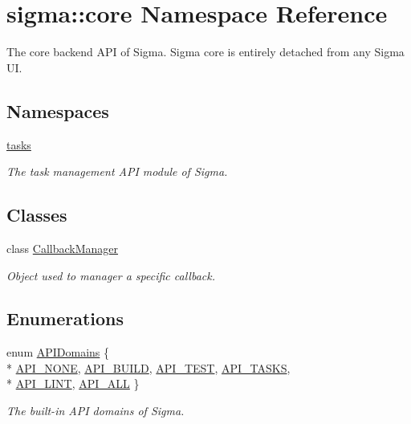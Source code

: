 \hypertarget{namespacesigma_1_1core}{}\section{sigma\+:\+:core Namespace Reference}
\label{namespacesigma_1_1core}


The core backend A\+P\+I of Sigma. Sigma core is entirely detached from any Sigma U\+I.  


\subsection*{Namespaces}
\begin{DoxyCompactItemize}
\item 
 \hyperlink{namespacesigma_1_1core_1_1tasks}{tasks}
\begin{DoxyCompactList}\small\item\em The task management A\+P\+I module of Sigma. \end{DoxyCompactList}\end{DoxyCompactItemize}
\subsection*{Classes}
\begin{DoxyCompactItemize}
\item 
class \hyperlink{classsigma_1_1core_1_1_callback_manager}{Callback\+Manager}
\begin{DoxyCompactList}\small\item\em Object used to manager a specific callback. \end{DoxyCompactList}\end{DoxyCompactItemize}
\subsection*{Enumerations}
\begin{DoxyCompactItemize}
\item 
enum \hyperlink{namespacesigma_1_1core_a48ec553a4adec5e4ca04a94946e39227}{A\+P\+I\+Domains} \{ \\*
\hyperlink{namespacesigma_1_1core_a48ec553a4adec5e4ca04a94946e39227ad5c128a2a2f3f1354dc44fd6e477b2c9}{A\+P\+I\+\_\+\+N\+O\+N\+E}, 
\hyperlink{namespacesigma_1_1core_a48ec553a4adec5e4ca04a94946e39227a21b294c75f929374e9eebfa67e31d80b}{A\+P\+I\+\_\+\+B\+U\+I\+L\+D}, 
\hyperlink{namespacesigma_1_1core_a48ec553a4adec5e4ca04a94946e39227acd512ee6c623f9c4b6faafc279cb93c8}{A\+P\+I\+\_\+\+T\+E\+S\+T}, 
\hyperlink{namespacesigma_1_1core_a48ec553a4adec5e4ca04a94946e39227a165d0d460d4f55091c38bab695b27bb4}{A\+P\+I\+\_\+\+T\+A\+S\+K\+S}, 
\\*
\hyperlink{namespacesigma_1_1core_a48ec553a4adec5e4ca04a94946e39227aac7402732b780aa9407183ed7bd7c809}{A\+P\+I\+\_\+\+L\+I\+N\+T}, 
\hyperlink{namespacesigma_1_1core_a48ec553a4adec5e4ca04a94946e39227a5328f8d7cbf6b6709e5f314832bcb007}{A\+P\+I\+\_\+\+A\+L\+L}
 \}\begin{DoxyCompactList}\small\item\em The built-\/in A\+P\+I domains of Sigma. \end{DoxyCompactList}
\end{DoxyCompactItemize}
